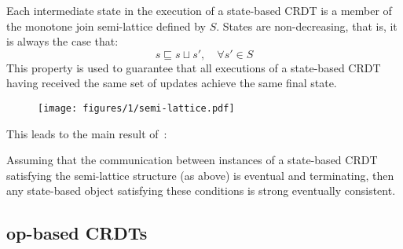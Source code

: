 Each intermediate state in the execution of a state-based CRDT is a member of
the monotone join semi-lattice defined by $S$. States are non-decreasing, that
is, it is always the case that:
\[
  s \sqsubseteq s \sqcup s',\quad \forall s' \in S
\]
This property is used to guarantee that all executions of a state-based CRDT
having received the same set of updates achieve the same final state.

\begin{figure}[H]
  \centering
  \texttt{[image: figures/1/semi-lattice.pdf]}
  \caption{\TODO}
\end{figure}

\TODO This leads to the main result of~\citep{shapiro11}:
\begin{theorem}
  Assuming that the communication between instances of a state-based CRDT
  satisfying the semi-lattice structure (as above) is eventual and terminating,
  then any state-based object satisfying these conditions is strong eventually
  consistent.
\end{theorem}

\subsection{op-based CRDTs}
